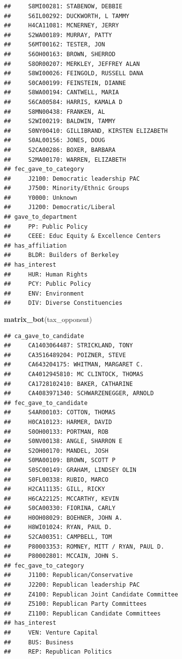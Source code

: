 \documentclass[]{book}
\newenvironment{Shaded}{\begin{snugshade}}{\end{snugshade}}
\newcommand{\KeywordTok}[1]{\textcolor[rgb]{0.13,0.29,0.53}{\textbf{#1}}}
\newcommand{\NormalTok}[1]{#1}
\begin{document}
\begin{verbatim}
##     S8MI00281: STABENOW, DEBBIE
##     S6IL00292: DUCKWORTH, L TAMMY
##     H4CA11081: MCNERNEY, JERRY
##     S2WA00189: MURRAY, PATTY
##     S6MT00162: TESTER, JON
##     S6OH00163: BROWN, SHERROD
##     S8OR00207: MERKLEY, JEFFREY ALAN
##     S8WI00026: FEINGOLD, RUSSELL DANA
##     S0CA00199: FEINSTEIN, DIANNE
##     S8WA00194: CANTWELL, MARIA
##     S6CA00584: HARRIS, KAMALA D
##     S8MN00438: FRANKEN, AL
##     S2WI00219: BALDWIN, TAMMY
##     S0NY00410: GILLIBRAND, KIRSTEN ELIZABETH
##     S0AL00156: JONES, DOUG
##     S2CA00286: BOXER, BARBARA
##     S2MA00170: WARREN, ELIZABETH
## fec_gave_to_category 
##     J2100: Democratic leadership PAC
##     J7500: Minority/Ethnic Groups
##     Y0000: Unknown
##     J1200: Democratic/Liberal
## gave_to_department 
##     PP: Public Policy
##     CEEE: Educ Equity & Excellence Centers
## has_affiliation 
##     BLDR: Builders of Berkeley
## has_interest 
##     HUR: Human Rights
##     PCY: Public Policy
##     ENV: Environment
##     DIV: Diverse Constituencies
\end{verbatim}

\begin{Shaded}
\begin{Highlighting}[]
\KeywordTok{matrix_bot}\NormalTok{(tax_opponent)}
\end{Highlighting}
\end{Shaded}

\begin{verbatim}
## ca_gave_to_candidate 
##     CA1403064487: STRICKLAND, TONY
##     CA3516489204: POIZNER, STEVE
##     CA643204175: WHITMAN, MARGARET C.
##     CA4012945810: MC CLINTOCK, THOMAS
##     CA1728102410: BAKER, CATHARINE
##     CA4083971340: SCHWARZENEGGER, ARNOLD
## fec_gave_to_candidate 
##     S4AR00103: COTTON, THOMAS
##     H0CA10123: HARMER, DAVID
##     S0OH00133: PORTMAN, ROB
##     S0NV00138: ANGLE, SHARRON E
##     S2OH00170: MANDEL, JOSH
##     S0MA00109: BROWN, SCOTT P
##     S0SC00149: GRAHAM, LINDSEY OLIN
##     S0FL00338: RUBIO, MARCO
##     H2CA11135: GILL, RICKY
##     H6CA22125: MCCARTHY, KEVIN
##     S0CA00330: FIORINA, CARLY
##     H0OH08029: BOEHNER, JOHN A.
##     H8WI01024: RYAN, PAUL D.
##     S2CA00351: CAMPBELL, TOM
##     P80003353: ROMNEY, MITT / RYAN, PAUL D. 
##     P80002801: MCCAIN, JOHN S.
## fec_gave_to_category 
##     J1100: Republican/Conservative
##     J2200: Republican leadership PAC
##     Z4100: Republican Joint Candidate Committee
##     Z5100: Republican Party Committees
##     Z1100: Republican Candidate Committees
## has_interest 
##     VEN: Venture Capital
##     BUS: Business
##     REP: Republican Politics
\end{verbatim}
\end{document}
